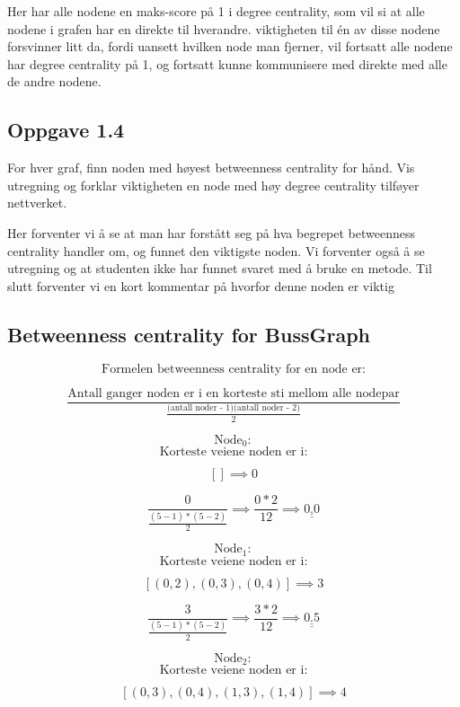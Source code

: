 \documentclass[11pt]{article}
\begin{document}
Her har alle nodene en maks-score på 1 i degree centrality, som vil si
at alle nodene i grafen har en direkte til hverandre. viktigheten til én
av disse nodene forsvinner litt da, fordi uansett hvilken node man
fjerner, vil fortsatt alle nodene har degree centrality på 1, og
fortsatt kunne kommunisere med direkte med alle de andre nodene.

    \hypertarget{oppgave-1.4}{%
\subsection*{Oppgave 1.4}\label{oppgave-1.4}}

For hver graf, finn noden med høyest betweenness centrality for hånd.
Vis utregning og forklar viktigheten en node med høy degree centrality
tilføyer nettverket.

Her forventer vi å se at man har forstått seg på hva begrepet
betweenness centrality handler om, og funnet den viktigste noden. Vi
forventer også å se utregning og at studenten ikke har funnet svaret med
å bruke en metode. Til slutt forventer vi en kort kommentar på hvorfor
denne noden er viktig

    \hypertarget{betweenness-centrality-for-bussgraph}{%
\subsection*{Betweenness centrality for
BussGraph}\label{betweenness-centrality-for-bussgraph}}

\[\text{Formelen betweenness centrality for en node er:}\]

\[\frac{\text{Antall ganger noden er i en korteste sti mellom alle nodepar}}{\frac{\text{(antall noder - 1)(antall noder - 2)}}{2}}\]

\[\text{Node}_0:\] \[\text{Korteste veiene noden er i:}\]

\[ [] \implies 0 \]

\[ \frac{0}{\frac{(5-1)*(5-2)}{2}} \implies \frac{0*2}{12} \implies \underline{\underline{ 0.0 }}\]

\[\text{Node}_1:\] \[\text{Korteste veiene noden er i:}\]

\[ [(0, 2), (0, 3), (0, 4)] \implies 3 \]

\[ \frac{3}{\frac{(5-1)*(5-2)}{2}} \implies \frac{3*2}{12} \implies \underline{\underline{ 0.5 }}\]

\[\text{Node}_2:\] \[\text{Korteste veiene noden er i:}\]

\[ [(0, 3), (0, 4), (1, 3), (1, 4)] \implies 4 \]
\end{document}
